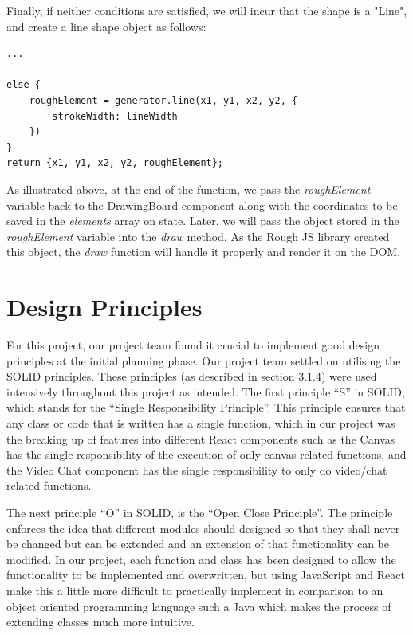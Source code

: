 Finally, if neither conditions are satisfied, we will incur that the shape is a "Line", and create a line shape object as follows: 

\begin{verbatim}
...

else {
    roughElement = generator.line(x1, y1, x2, y2, {
        strokeWidth: lineWidth
    })
}
return {x1, y1, x2, y2, roughElement};
\end{verbatim}

As illustrated above, at the end of the function, we pass the \textit{roughElement} variable back to the DrawingBoard component along with the coordinates to be saved in the \textit{elements} array on state. Later, we will pass the object stored in the \textit{roughElement} variable into the \textit{draw} method. As the Rough JS library created this object, the \textit{draw} function will handle it properly and render it on the DOM.  

\section{Design Principles}
For this project, our project team found it crucial to implement good design principles at the initial planning phase. Our project team settled on utilising the SOLID principles. These principles (as described in section 3.1.4) were used intensively throughout this project as intended. The first principle “S” in SOLID, which stands for the “Single Responsibility Principle”. This principle ensures that any class or code that is written has a single function, which in our project was the breaking up of features into different React components such as the Canvas has the single responsibility of the execution of only canvas related functions, and the Video Chat component has the single responsibility to only do video/chat related functions.

The next principle “O” in SOLID, is the “Open Close Principle”. The principle enforces the idea that different modules should designed so that they shall never be changed but can be extended and an extension of that functionality can be modified. In our project, each function and class has been designed to allow the functionality to be implemented and overwritten, but using JavaScript and React make this a little more difficult to practically implement in comparison to an object oriented programming language such a Java which makes the process of extending classes much more intuitive.

